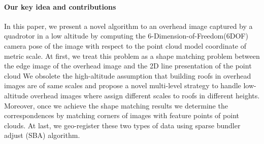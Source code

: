 \paragraph{Our key idea and contributions}
%
In this paper, we present a novel algorithm to  an overhead image captured by a quadrotor in a low altitude by computing the 6-Dimension-of-Freedom(6DOF) camera pose of the image with respect to the point cloud model coordinate of metric scale. 
%
At first, we treat this problem as a shape matching problem between the edge image of the overhead image and the 2D line presentation of the point cloud 
%
We obsolete the high-altitude assumption that building roofs in overhead images are of same scales and propose a novel multi-level strategy to handle low-altitude overhead images where assign different scales to roofs in different heights. 
Moreover, once we achieve the shape matching results we determine the correspondences by matching corners of images with feature points of point clouds. 
At last, we geo-register these two types of data using sparse bundler adjust (SBA) algorithm. 

